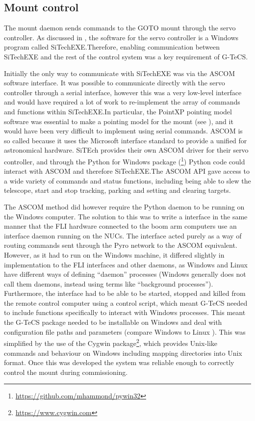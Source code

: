 \subsection{Mount control}
\label{sec:mount}
\begin{colsection}

The mount daemon sends commands to the GOTO mount through the  servo controller. As discussed in , the software for the servo controller is a Windows program called SiTechEXE.\@ Therefore, enabling communication between SiTechEXE and the rest of the control system was a key requirement of G-TeCS.\@

Initially the only way to communicate with SiTechEXE was via the ASCOM software interface. It was possible to communicate directly with the servo controller through a serial interface, however this was a very low-level interface and would have required a lot of work to re-implement the array of commands and functions within SiTechEXE.\@ In particular, the PointXP pointing model software was essential to make a pointing model for the mount (see ), and it would have been very difficult to implement using serial commands. ASCOM is so called because it uses the Microsoft  interface standard to provide a unified  for astronomical hardware. SiTEch provides their own ASCOM driver for their servo controller, and through the Python for Windows package (\footnote{\url{https://github.com/mhammond/pywin32}}) Python code could interact with ASCOM and therefore SiTechEXE.\@ The ASCOM API gave access to a wide variety of commands and status functions, including being able to slew the telescope, start and stop tracking, parking and setting and clearing targets.

The ASCOM method did however require the Python daemon to be running on the Windows computer. The solution to this was to write a  interface in the same manner that the FLI hardware connected to the boom arm computers use an interface daemon running on the NUCs. The  interface acted purely as a way of routing commands sent through the Pyro network to the ASCOM equivalent. However, as it had to run on the Windows machine, it differed slightly in implementation to the FLI interfaces and other daemons, as Windows and Linux have different ways of defining ``daemon'' processes (Windows generally does not call them daemons, instead using terms like ``background processes''). Furthermore, the interface had to be able to be started, stopped and killed from the remote control computer using a  control script, which meant G-TeCS needed to include functions specifically to interact with Windows processes. This meant the G-TeCS package needed to be installable on Windows and deal with configuration file paths and parameters (compare Windows  to Linux ). This was simplified by the use of the Cygwin package\footnote{\url{https://www.cygwin.com}}, which provides Unix-like commands and behaviour on Windows including mapping directories into Unix format. Once this was developed the system was reliable enough to correctly control the mount during commissioning.


\end{colsection}
